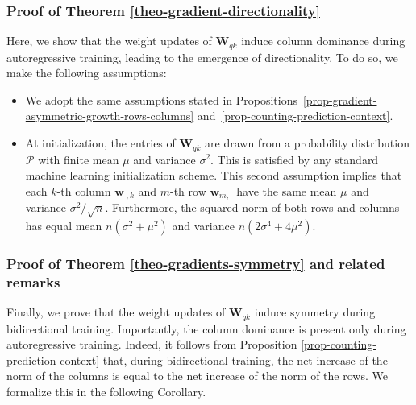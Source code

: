 \subsubsection{Proof of Theorem \ref{theo-gradient-directionality}}
\label{supp-math-theo-gradient-directionality}
%
Here, we show that the weight updates of $\bm{W}_{qk}$ induce column dominance during autoregressive training, leading to the emergence of directionality.
%
To do so, we make the following assumptions:
%
\begin{itemize}[noitemsep,nolistsep]
%
    \item We adopt the same assumptions stated in Propositions~\ref{prop-gradient-asymmetric-growth-rows-columns} and~\ref{prop-counting-prediction-context}.
    \item At initialization, the entries of \( \bm{W}_{qk} \) are drawn from a probability distribution \( \mathcal{P} \) with finite mean \( \mu \) and variance \( \sigma^2 \).  
    This is satisfied by any standard machine learning initialization scheme. This second assumption implies that each $k$-th column $\bm{w}_{\cdot,k}$ and $m$-th row $\bm{w}_{m, \cdot}$ have the same mean $\mu$ and variance $\sigma^2/\sqrt{n}$.
    Furthermore, the squared norm of both rows and columns has equal mean $n(\sigma^2 + \mu^2)$ and variance $n(2\sigma^4 + 4\mu^2)$.
%
\end{itemize}
%

%







\subsubsection{Proof of Theorem \ref{theo-gradients-symmetry} and related remarks}
\label{supp-math-theo-symmetry-gradients}
%
Finally, we prove that the weight updates of $\bm{W}_{qk}$ induce symmetry during bidirectional training.
%
Importantly, the column dominance is present only during autoregressive training.
%
Indeed, it follows from Proposition \ref{prop-counting-prediction-context} that, during bidirectional training, the net increase of the norm of the columns is equal to the net increase of the norm of the rows.
%
We formalize this in the following Corollary.
%


%
%

